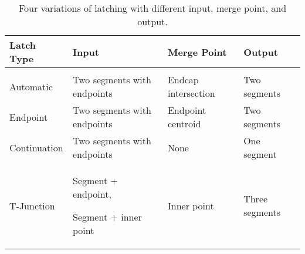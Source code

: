 
\begin{table}%
\centering
\begin{tabular}{p{2.5cm}| p{5.4cm} | p{3.5cm} | p{3cm}}
\textbf{Latch Type} & \textbf{Input} & \textbf{Merge Point} & \textbf{Output} \\
\hline
& & & \\

Automatic &

Two segments with endpoints & 

Endcap intersection &

Two segments

\\ 

Endpoint &

Two segments with endpoints & 

Endpoint centroid &

Two segments

\\ 

Continuation &

Two segments with endpoints & 

None &

One segment

\\ 

T-Junction &

Segment + endpoint, \par Segment + inner point & 

Inner point &

Three segments

\\ 

\end{tabular}
\caption[Latching Summary]{Four variations of latching with
  different input, merge point, and output.}
\label{tab:latch}
\end{table}
